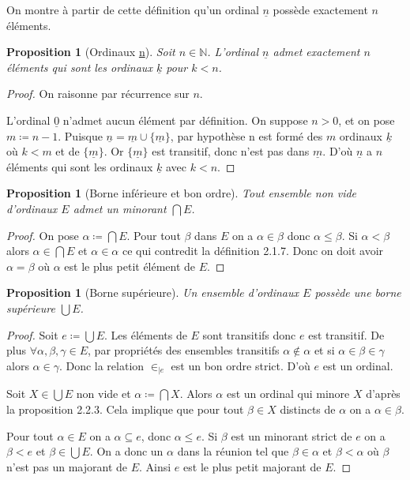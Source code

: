 \documentclass{article}
\theoremstyle{definition}
\theoremstyle{plain}
\newtheorem{proposition}[subsubsection]{Proposition}
\theoremstyle{plain}
\theoremstyle{plain}
\theoremstyle{plain}
\theoremstyle{plain}
\begin{document}
On montre à partir de cette définition qu'un ordinal \( \underline{n} \) possède exactement \( n \) éléments.
\begin{proposition}[Ordinaux \underline{n}]
	Soit \( n \in \mathbb{N} \). L'ordinal \( \underline{n} \) admet exactement \( n \) éléments qui sont les ordinaux \( \underline{k} \) pour \( k < n \).
\end{proposition}
\begin{proof}
	On raisonne par récurrence sur \( n \). 
	
	L'ordinal \( \underline{0} \) n'admet aucun élément par définition.
	On suppose \( n > 0 \), et on pose \( m \coloneqq n - 1 \). Puisque \( \underline{n} = \underline{m} \cup \{\underline{m}\} \), par hypothèse n est formé des \( m \) ordinaux \( \underline{k} \) où \( k < m \) et de \( \{\underline{m}\} \). Or \( \{\underline{m}\} \) est transitif, donc n'est pas dans \( \underline{m} \). D'où \( \underline{n} \) a \( n \) éléments qui sont les ordinaux \( \underline{k} \) avec \( k < n \).
\end{proof}

\begin{proposition}[Borne inférieure et bon ordre]
	Tout ensemble non vide d'ordinaux \( E\) admet un minorant \( \bigcap E \).
\end{proposition}
\begin{proof}
	On pose \( \alpha \coloneqq \bigcap E \). Pour tout \( \beta \) dans \( E \) on a \( \alpha \in \beta \) donc \( \alpha \le \beta \). Si \( \alpha < \beta \) alors \( \alpha \in \bigcap E \) et \( \alpha \in \alpha \) ce qui contredit la définition 2.1.7. Donc on doit avoir \( \alpha = \beta \) où \( \alpha \) est le plus petit élément de \( E \).
\end{proof}
\begin{proposition}[Borne supérieure]
	Un ensemble d'ordinaux \( E \) possède une borne supérieure \( \bigcup E \). 
\end{proposition}
\begin{proof}
	Soit \( e \coloneqq \bigcup E \). Les éléments de \( E \) sont transitifs donc \( e \) est transitif. De plus \( \forall \alpha, \beta, \gamma \in E \), par propriétés des ensembles transitifs \( \alpha \notin \alpha  \) et si \( \alpha \in \beta \in \gamma \) alors \( \alpha \in \gamma \). Donc la relation \( \in_{|e} \) est un bon ordre strict. D'où \( e \) est un ordinal.

	Soit \( X \in \bigcup E \) non vide et \( \alpha \coloneqq \bigcap X \). Alors \( \alpha \) est un ordinal qui minore \( X \) d'après la proposition 2.2.3. Cela implique que pour tout \( \beta \in X \) distincts de \( \alpha \) on a \( \alpha \in \beta \). 

	Pour tout \( \alpha \in E \) on a \( \alpha \subseteq e \), donc \( \alpha \le e \). Si \( \beta \) est un minorant strict de \( e \) on a \( \beta < e \) et \( \beta \in \bigcup E \). On a donc un \( \alpha \) dans la réunion tel que \( \beta \in \alpha \) et \( \beta < \alpha \) où \( \beta \) n'est pas un majorant de \( E \). Ainsi \( e \) est le plus petit majorant de \( E \).
\end{proof}
\end{document}
